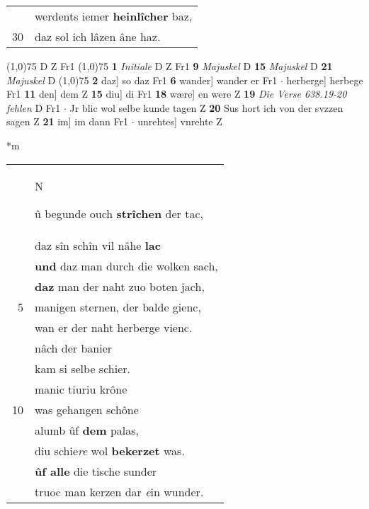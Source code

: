 \documentclass[8pt,a4paper,notitlepage]{article}
\begin{document}
\begin{table}[ht]
\begin{minipage}[t]{0.5\linewidth}
\begin{tabular}{rl}
 & werdents iemer \textbf{heinlîcher} baz,\\ 
30 & daz sol ich lâzen âne haz.\\ 
\end{tabular}
\scriptsize
\line(1,0){75} \newline
D Z Fr1 \newline
\line(1,0){75} \newline
\textbf{1} \textit{Initiale} D Z Fr1  \textbf{9} \textit{Majuskel} D  \textbf{15} \textit{Majuskel} D  \textbf{21} \textit{Majuskel} D  \newline
\line(1,0){75} \newline
\textbf{2} daz] so daz Fr1 \textbf{6} wander] wander er Fr1  $\cdot$ herberge] herbege Fr1 \textbf{11} den] dem Z \textbf{15} diu] di Fr1 \textbf{18} wære] en were Z \textbf{19} \textit{Die Verse 638.19-20 fehlen} D Fr1   $\cdot$ Jr blic wol selbe kunde tagen Z \textbf{20} Sus hort ich von der svzzen sagen Z \textbf{21} im] im dann Fr1  $\cdot$ unrehtes] vnrehte Z \newline
\end{minipage}
\hspace{0.5cm}
\begin{minipage}[t]{0.5\linewidth}
\small
\begin{center}*m
\end{center}
\begin{tabular}{rl}
 & \begin{large}N\end{large}û begunde ouch \textbf{strîchen} der tac,\\ 
 & daz sîn schîn vil nâhe \textbf{lac}\\ 
 & \textbf{und} daz man durch die wolken sach,\\ 
 & \textbf{daz} man der naht zuo boten jach,\\ 
5 & manigen sternen, der balde gienc,\\ 
 & wan er der naht  herberge vienc.\\ 
 & nâch der banier\\ 
 & kam si selbe schier.\\ 
 & manic tiuriu krône\\ 
10 & was gehangen schône\\ 
 & alumb ûf \textbf{dem} palas,\\ 
 & diu schie\textit{re} wol \textbf{bekerzet} was.\\ 
 & \textbf{ûf alle} die tische sunder\\ 
 & truoc man kerzen dar \textit{e}in wunder.\\ 

\end{tabular}
\end{minipage}
\end{table}
\end{document}
